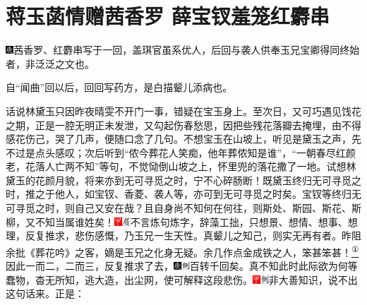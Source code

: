 

\chapter{蒋玉菡情赠茜香罗 薛宝钗羞笼红麝串}

{\includegraphics[width=3mm]{../Images/00004}\kaishu 茜香罗、红麝串写于一回，盖琪官虽系优人，后回与袭人供奉玉兄宝卿得同终始者，非泛泛之文也。}

{\kaishu 自``闻曲''回以后，回回写药方，是白描颦儿添病也。}

话说林黛玉只因昨夜晴雯不开门一事，错疑在宝玉身上。至次日，又可巧遇见饯花之期，正是一腔无明正未发泄，又勾起伤春愁思，因把些残花落瓣去掩埋，由不得感花伤己，哭了几声，便随口念了几句。不想宝玉在山坡上，听见是黛玉之声，先不过是点头感叹；次后听到``侬今葬花人笑痴，他年葬侬知是谁''，``一朝春尽红颜老，花落人亡两不知''等句，不觉恸倒山坡之上，怀里兜的落花撒了一地。试想林黛玉的花颜月貌，将来亦到无可寻觅之时，宁不心碎肠断！既黛玉终归无可寻觅之时，推之于他人，如宝钗、香菱、袭人等，亦可到无可寻觅之时矣。宝钗等终归无可寻觅之时，则自己又安在哉？且自身尚不知何在何往，则斯处、斯园、斯花、斯柳，又不知当属谁姓矣！{\includegraphics[width=3mm]{../Images/00002}\includegraphics[width=3mm]{../Images/00010}\footnotesize \kaishu 不言炼句炼字，辞藻工拙，只想景、想情、想事、想理，反复推求，悲伤感慨，乃玉兄一生天性。真颦儿之知己，则实无再有者。昨阻余批《葬花吟》之客，嫡是玉兄之化身无疑。余几作点金成铁之人，笨甚笨甚！}\href{../Text/part0032_split_000.html\#lnkback_1_a}{\textsuperscript{①}}因此一而二，二而三，反复推求了去，{\includegraphics[width=3mm]{../Images/00004}\includegraphics[width=3mm]{../Images/00011}\footnotesize \kaishu 百转千回矣。}真不知此时此际欲为何等蠢物，杳无所知，逃大造，出尘网，使可解释这段悲伤。{\includegraphics[width=3mm]{../Images/00002}\includegraphics[width=3mm]{../Images/00011}\footnotesize \kaishu 非大善知识，说不出这句话来。}正是：

